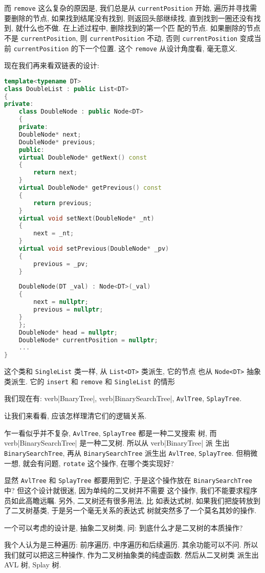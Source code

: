 \documentclass[a4paper]{ctexart}
\theoremstyle{definition}
\theoremstyle{definition}
\begin{document}
而 \verb|remove| 这么复杂的原因是, 我们总是从 \verb|currentPosition|
开始, 遍历并寻找需要删除的节点, 如果找到结尾没有找到, 则返回头部继续找,
直到找到一圈还没有找到, 就什么也不做. 在上述过程中, 删除找到的第一个匹
配的节点. 如果删除的节点不是 \verb|currentPosition|, 则
\verb|currentPosition| 不动, 否则 \verb|currentPosition| 变成当前
\verb|currentPosition| 的下一个位置. 这个 \verb|remove| 从设计角度看,
毫无意义.

现在我们再来看双链表的设计:
\begin{lstlisting}[language=C++]
template<typename DT>
class DoubleList : public List<DT>
{
private:
    class DoubleNode : public Node<DT>
    {
    private:
	DoubleNode* next;
	DoubleNode* previous;
    public:
	virtual DoubleNode* getNext() const
	{
	    return next;
	}
	virtual DoubleNode* getPrevious() const
	{
	    return previous;
	}
	virtual void setNext(DoubleNode* _nt)
	{
	    next = _nt;
	}
	virtual void setPrevious(DoubleNode* _pv)
	{
	    previous = _pv;
	}
		
	DoubleNode(DT _val) : Node<DT>(_val)
	{
	    next = nullptr;
	    previous = nullptr;
	}
    };
    DoubleNode* head = nullptr;
    DoubleNode* currentPosition = nullptr;
    ...
}
\end{lstlisting}

这个类和 \verb|SingleList| 类一样, 从 \verb|List<DT>| 类派生, 它的节点
也从 \verb|Node<DT>| 抽象类派生. 它的 \verb|insert| 和 \verb|remove| 和 \verb|SingleList| 的情形

我们现在有: verb|BnaryTree|,
verb|BinarySearchTree|, \verb|AvlTree|, \verb|SplayTree|.

让我们来看看, 应该怎样理清它们的逻辑关系.

乍一看似乎并不复杂, \verb|AvlTree|, \verb|SplayTree| 都是一种二叉搜索
树, 而 verb|BinarySearchTree| 是一种二叉树. 所以从 verb|BinaryTree| 派
生出 \verb|BinarySearchTree|, 再从 \verb|BinarySearchTree| 派生出
\verb|AvlTree|, \verb|SplayTree|. 但稍微一想, 就会有问题,
\verb|rotate| 这个操作, 在哪个类实现好?

显然 \verb|AvlTree| 和 \verb|SplayTree| 都要用到它, 于是这个操作放在
\verb|BinarySearchTree| 中? 但这个设计就很迷, 因为单纯的二叉树并不需要
这个操作, 我们不能要求程序员如此高瞻远瞩. 另外, 二叉树还有很多用法, 比
如表达式树, 如果我们把旋转放到了二叉树基类, 于是另一个毫无关系的表达式
树就突然多了一个莫名其妙的操作.

一个可以考虑的设计是, 抽象二叉树类, 问: 到底什么才是二叉树的本质操作?

我个人认为是三种遍历: 前序遍历, 中序遍历和后续遍历. 其余功能可以不问.
所以我们就可以把这三种操作, 作为二叉树抽象类的纯虚函数. 然后从二叉树类
派生出 AVL 树, Splay 树.
\end{document}

